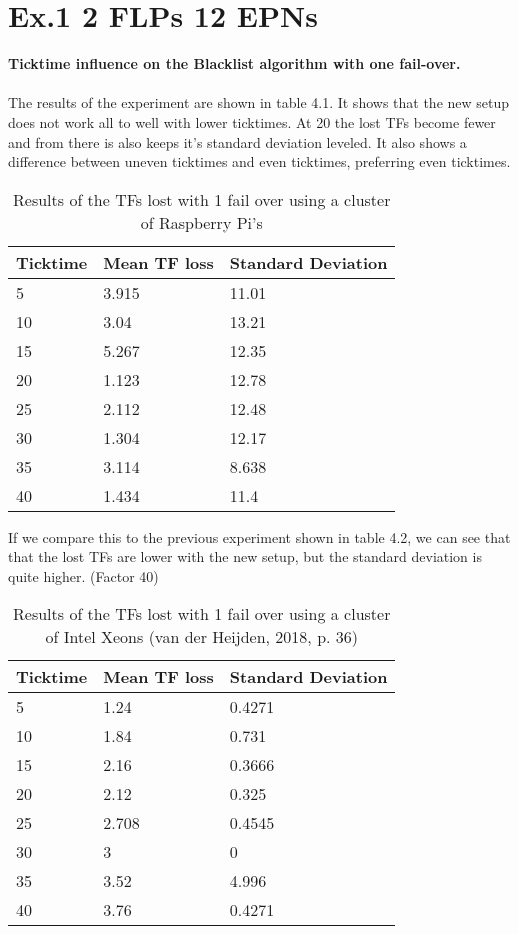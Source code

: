 \section{Ex.1 2 FLPs 12 EPNs}
\textbf{Ticktime influence on the Blacklist algorithm with one fail-over.}
\\\\
The results of the experiment are shown in table 4.1. It shows that the new setup does not work all to well with lower ticktimes. At 20 the lost TFs become fewer and from there is also keeps it's standard deviation leveled. It also shows a difference between uneven ticktimes and even ticktimes, preferring even ticktimes.

\begin{table}[htb]
\begin{tabular}{| l | l | l |}
\hline
Ticktime & Mean TF loss & Standard Deviation \\ \hline
5 & 3.915 & 11.01 \\ \hline
10 & 3.04 & 13.21 \\ \hline
15 & 5.267 & 12.35 \\ \hline
20 & 1.123 & 12.78 \\ \hline
25 & 2.112 & 12.48 \\ \hline
30 & 1.304 & 12.17 \\ \hline
35 & 3.114 & 8.638 \\ \hline
40 & 1.434 & 11.4 \\ \hline
\end{tabular}
\caption{Results of the TFs lost with 1 fail over using a cluster of Raspberry Pi's}
\end{table}

If we compare this to the previous experiment shown in table 4.2, we can see that that the lost TFs are lower with the new setup, but the standard deviation is quite higher. (Factor 40)

\begin{table}[htb]
\begin{tabular}{| l | l | l |}
\hline
Ticktime & Mean TF loss & Standard Deviation \\ \hline
5 & 1.24 & 0.4271 \\ \hline
10 & 1.84 & 0.731 \\ \hline
15 & 2.16 & 0.3666 \\ \hline
20 & 2.12 & 0.325 \\ \hline
25 & 2.708 & 0.4545 \\ \hline
30 & 3 & 0 \\ \hline
35 & 3.52 & 4.996 \\ \hline
40 & 3.76 & 0.4271 \\ \hline
\end{tabular}
\caption{Results of the TFs lost with 1 fail over using a cluster of Intel Xeons (van der Heijden, 2018, p. 36)}
\end{table}

